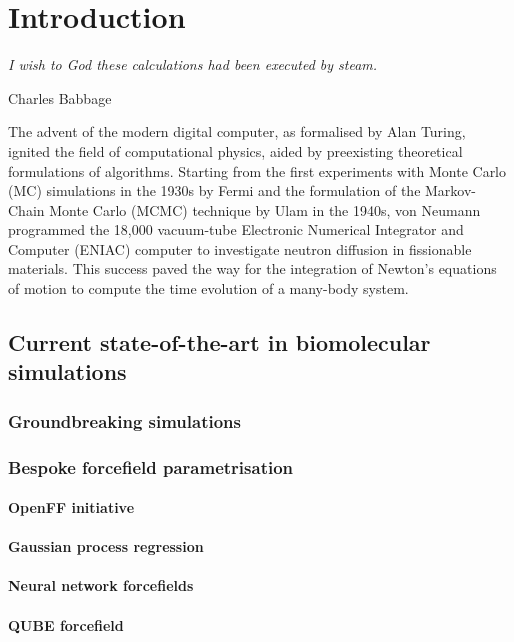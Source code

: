 \chapter{Introduction}
\label{Motivation}
%
\epigraph{\textit{I wish to God these calculations had been executed by steam.}}{Charles Babbage}
The advent of the modern digital computer, as formalised by Alan Turing,\cite{Turing1937} ignited the field of computational physics, aided by preexisting theoretical formulations of algorithms. Starting from the first experiments with Monte Carlo (MC) simulations in the 1930s by Fermi and the formulation of the Markov-Chain Monte Carlo (MCMC) technique by Ulam in the 1940s, von Neumann programmed the 18,000 vacuum-tube Electronic Numerical Integrator and Computer (ENIAC) computer to investigate neutron diffusion in fissionable materials.\cite{metropolis1987beginning} This success paved the way for the integration of Newton's equations of motion to compute the time evolution of a many-body system.\\

\section{Current state-of-the-art in biomolecular simulations}
\label{sec:sota_bio_sims}
\subsection{Groundbreaking simulations}

\subsection{Bespoke forcefield parametrisation}
\label{sec:ff_devel}

\subsubsection{OpenFF initiative}

\subsubsection{Gaussian process regression}

\subsubsection{Neural network forcefields}

\subsubsection{QUBE forcefield}

